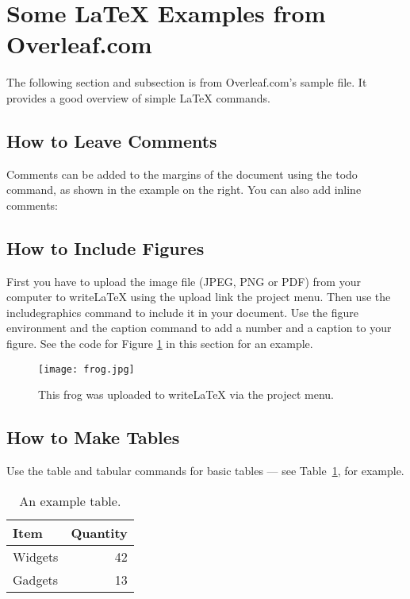 \documentclass[a4paper]{article}
\begin{document}
\section{Some \LaTeX {}{} Examples from Overleaf.com} \label{sec:examples}

The following section and subsection is from Overleaf.com's sample file.  It provides a good overview of simple \LaTeX {} commands.

\subsection{How to Leave Comments}

Comments can be added to the margins of the document using the  todo command, as shown in the example on the right. You can also add inline comments:


\subsection{How to Include Figures}

First you have to upload the image file (JPEG, PNG or PDF) from your computer to writeLaTeX using the upload link the project menu. Then use the includegraphics command to include it in your document. Use the figure environment and the caption command to add a number and a caption to your figure. See the code for Figure \ref{fig:frog} in this section for an example.

\begin{figure}[ht] %
\centering
\texttt{[image: frog.jpg]}
\caption{\label{fig:frog}This frog was uploaded to writeLaTeX via the project menu.}
\end{figure}

\subsection{How to Make Tables}

Use the table and tabular commands for basic tables --- see Table~\ref{tab:widgets}, for example.

\begin{table}
\centering
\begin{tabular}{l|r}
Item & Quantity \\\hline
Widgets & 42 \\
Gadgets & 13
\end{tabular}
\caption{\label{tab:widgets}An example table.}
\end{table}
\end{document}
